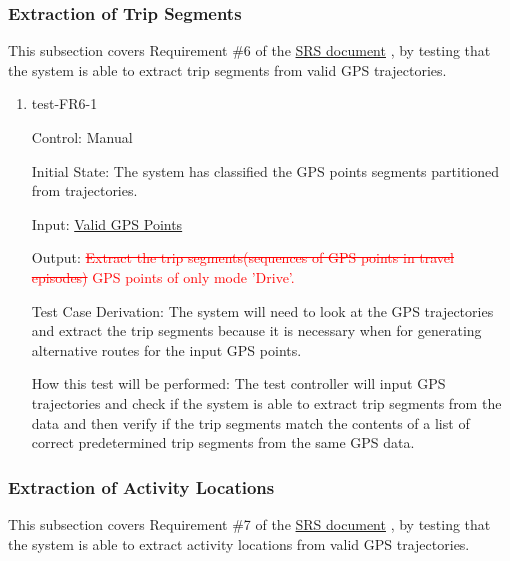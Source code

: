 \documentclass[12pt, titlepage]{article}
\begin{document}
\subsubsection{Extraction of Trip Segments}

This subsection covers Requirement \#6 of the \href{https://github.com/paezha/PyERT-BLACK/blob/main/docs/SRS/SRS.pdf}{SRS document} \citep{SRS}, by testing that the system is able to extract trip segments from valid GPS trajectories.

\begin{enumerate}

\item{test-FR6-1\\} \label{test-FR6-1}

Control: Manual 
					
Initial State: The system has classified the GPS points segments partitioned from trajectories.
					
Input: \href{https://github.com/paezha/PyERT-BLACK/blob/rev0-test/quarto-example/data/sample-gps/sample-gps-1.csv}{Valid GPS Points}
					
Output: \textcolor{red}{\sout{Extract the trip segments(sequences of GPS points in travel episodes)} GPS points of only mode 'Drive'.}

Test Case Derivation: The system will need to look at the GPS trajectories and extract the trip segments because it is necessary when for generating alternative routes for the input GPS points.
					
How this test will be performed: The test controller will input GPS trajectories and check if the system is able to extract trip segments from the data and then verify if the trip segments match the contents of a list of correct predetermined trip segments from the same GPS data.

\end{enumerate}

\subsubsection{Extraction of Activity Locations}

This subsection covers Requirement \#7 of the \href{https://github.com/paezha/PyERT-BLACK/blob/main/docs/SRS/SRS.pdf}{SRS document} \citep{SRS}, by testing that the system is able to extract activity locations from valid GPS trajectories.
\end{document}
